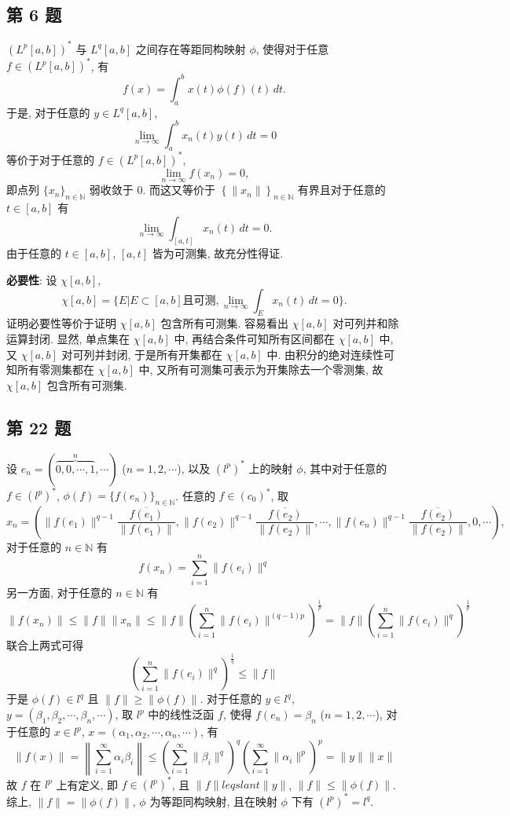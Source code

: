 \documentclass[\ROOT/main.tex]{subfiles}
\begin{document}
\subsection{第 6 题}
$(L^p [a, b])^{*}$ 与 $L^q [a, b]$ 之间存在等距同构映射 $\phi$,
使得对于任意 $f \in (L^p [a, b])^{*}$, 有
\[
    f(x) = \int_{a}^{b} x(t) \phi (f) (t) \, dt.
\]
于是, 对于任意的 $y \in L^q [a, b]$,
\[
    \lim_{n \to \infty} \int_{a}^{b} x_n(t) y(t) \, dt = 0
\]
等价于对于任意的 $f \in (L^p [a, b])^{*}$,
\[
    \lim_{n \to \infty} f(x_n) = 0,
\]
即点列 $\{ x_{n} \}_{n \in \mathbb{N}}$ 弱收敛于 $0$.
而这又等价于 $\left\{ \| x_n \| \right\}_{n \in \mathbb{N}}$ 有界且对于任意的 $t \in [a, b]$ 有
\[
    \lim_{n \to \infty} \int_{[a, t]} x_n(t) \, dt = 0.
\]
由于任意的 $t \in [a, b]$, $[a, t]$ 皆为可测集, 故充分性得证.

\noindent \textbf{必要性}:
设 $\chi [a, b]$,
\[
    \chi [a, b] = \{ E | E \subset [a, b] \text{且可测}, \lim_{n \to \infty} \int_{E} x_n(t) \, dt = 0 \}.
\]
证明必要性等价于证明 $\chi [a, b]$ 包含所有可测集.
容易看出 $\chi [a, b]$ 对可列并和除运算封闭.
显然, 单点集在 $\chi [a, b]$ 中, 再结合条件可知所有区间都在 $\chi [a, b]$ 中,
又 $\chi [a, b]$ 对可列并封闭, 于是所有开集都在 $\chi [a, b]$ 中.
由积分的绝对连续性可知所有零测集都在 $\chi [a, b]$ 中,
又所有可测集可表示为开集除去一个零测集, 故 $\chi [a, b]$ 包含所有可测集.

\subsection{第 22 题}
设 $e_n = (\overbrace{0, 0, \cdots, 1}^{n}, \cdots)$ ($n = 1, 2, \cdots$),
以及 $(l^p)^*$ 上的映射 $\phi$,
其中对于任意的 $f \in (l^p)^*$, $\phi (f) = \{ f(e_n) \}_{n \in \mathbb{N}}$.
任意的 $f \in (c_0)^*$, 取
\[
    x_n = (\| f(e_1) \|^{q - 1} \frac{\overline{f(e_1)}}{\| f(e_1) \|},
    \| f(e_2) \|^{q - 1} \frac{\overline{f(e_2)}}{\| f(e_2) \|},
    \cdots,
    \| f(e_n) \|^{q - 1} \frac{\overline{f(e_2)}}{\| f(e_2) \|}, 0, \cdots),
\]
对于任意的 $n \in \mathbb{N}$ 有
\[
    f(x_n) = \sum_{i = 1}^{n} \| f(e_i) \|^q
\]
另一方面, 对于任意的 $n \in \mathbb{N}$ 有
\[
    \| f(x_n) \|
    \leqslant \| f \| \| x_n \|
    \leqslant \| f \| \left( \sum_{i = 1}^{n} \| f(e_i) \|^{(q - 1) p} \right)^{\frac{1}{p}}
    = \| f \| \left( \sum_{i = 1}^{n} \| f(e_i) \|^{q} \right)^{\frac{1}{p}}
\]
联合上两式可得
\[
    \left( \sum_{i = 1}^{n} \| f(e_i) \|^q \right)^{\frac{1}{q}} \leqslant \| f \|
\]
于是 $\phi (f) \in l^q$ 且 $\| f \| \geqslant \| \phi (f) \|$.
对于任意的 $y \in l^q$, $y = (\beta_1, \beta_2, \cdots, \beta_n, \cdots)$,
取 $l^p$ 中的线性泛函 $f$, 使得 $f(e_n) = \beta_n$ ($n = 1, 2, \cdots$),
对于任意的 $x \in l^p$, $x = (\alpha_1, \alpha_2, \cdots, \alpha_n, \cdots)$, 有
\[
    \| f(x) \|
    = \left\| \sum_{i = 1}^{\infty} \alpha_i \beta_i \right\| 
    \leqslant \left( \sum_{i = 1}^{\infty} \| \beta_i \|^q \right)^q \left( \sum_{i = 1}^{\infty} \| \alpha_i \|^p \right)^p
    = \| y \| \| x \|
\]
故 $f$ 在 $l^p$ 上有定义, 即 $f \in (l^p)^*$,
且 $\| f \| leqslant \| y \|$, $\| f \| \leqslant \| \phi (f) \|$.
综上, $\| f \| = \| \phi (f) \|$, $\phi$ 为等距同构映射, 且在映射 $\phi$ 下有 $(l^p)^* = l^q$.
\end{document}
